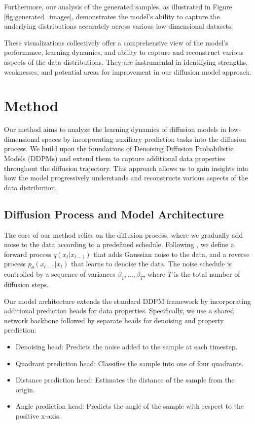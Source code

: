 \documentclass{article} %
\begin{document}
Furthermore, our analysis of the generated samples, as illustrated in Figure \ref{fig:generated_images}, demonstrates the model's ability to capture the underlying distributions accurately across various low-dimensional datasets.

These visualizations collectively offer a comprehensive view of the model's performance, learning dynamics, and ability to capture and reconstruct various aspects of the data distributions. They are instrumental in identifying strengths, weaknesses, and potential areas for improvement in our diffusion model approach.

\section{Method}
\label{sec:method}

Our method aims to analyze the learning dynamics of diffusion models in low-dimensional spaces by incorporating auxiliary prediction tasks into the diffusion process. We build upon the foundations of Denoising Diffusion Probabilistic Models (DDPMs) \cite{ddpm} and extend them to capture additional data properties throughout the diffusion trajectory. This approach allows us to gain insights into how the model progressively understands and reconstructs various aspects of the data distribution.

\subsection{Diffusion Process and Model Architecture}

The core of our method relies on the diffusion process, where we gradually add noise to the data according to a predefined schedule. Following \citet{ddpm}, we define a forward process $q(x_t|x_{t-1})$ that adds Gaussian noise to the data, and a reverse process $p_\theta(x_{t-1}|x_t)$ that learns to denoise the data. The noise schedule is controlled by a sequence of variances $\beta_1, \ldots, \beta_T$, where $T$ is the total number of diffusion steps.

Our model architecture extends the standard DDPM framework by incorporating additional prediction heads for data properties. Specifically, we use a shared network backbone followed by separate heads for denoising and property prediction:

\begin{itemize}
    \item Denoising head: Predicts the noise added to the sample at each timestep.
    \item Quadrant prediction head: Classifies the sample into one of four quadrants.
    \item Distance prediction head: Estimates the distance of the sample from the origin.
    \item Angle prediction head: Predicts the angle of the sample with respect to the positive x-axis.
\end{itemize}
\end{document}
